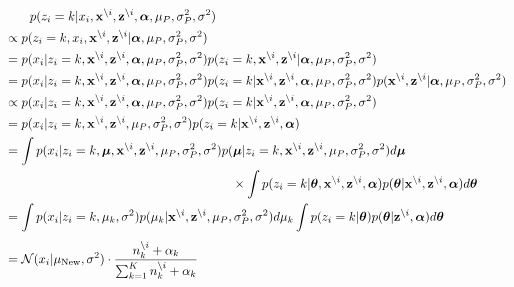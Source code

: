 \documentclass[a4paper,10.5pt,uplatex]{jsarticle}  %
\newcommand{\E}{\mathbb{E}}
\newcommand{\cN}{\mathcal{N}}
\newcommand{\btheta}{\boldsymbol{\theta}}
\newcommand{\balpha}{\boldsymbol{\alpha}}
\newcommand{\bmu}{\boldsymbol{\mu}}
\newcommand{\bz}{\mathbf{z}}
\newcommand{\bx}{\mathbf{x}}
\newcommand{\deli}{{\backslash i}}
\begin{document}
\begin{align}
  &\qquad p(z_i = k| x_i, \bx^\deli, \bz^\deli, \balpha, \mu_P, \sigma^2_P, \sigma^2)\\
  &\propto p(z_i=k, x_i, \bx^\deli, \bz^\deli | \balpha, \mu_P, \sigma^2_P, \sigma^2)\\
  &= p(x_i | z_i=k, \bx^\deli, \bz^\deli, \balpha, \mu_P, \sigma^2_P, \sigma^2) p(z_i=k, \bx^\deli, \bz^\deli | \balpha, \mu_P, \sigma^2_P, \sigma^2)\\
  &= p(x_i | z_i=k, \bx^\deli, \bz^\deli, \balpha, \mu_P, \sigma^2_P, \sigma^2) p(z_i=k | \bx^\deli, \bz^\deli, \balpha, \mu_P, \sigma^2_P, \sigma^2) p(\bx^\deli, \bz^\deli | \balpha, \mu_P, \sigma^2_P, \sigma^2)\\
  &\propto p(x_i | z_i=k, \bx^\deli, \bz^\deli, \balpha, \mu_P, \sigma^2_P, \sigma^2) p(z_i=k| \bx^\deli, \bz^\deli, \balpha, \mu_P, \sigma^2_P, \sigma^2)\\
  &= p(x_i | z_i=k, \bx^\deli, \bz^\deli,  \mu_P, \sigma^2_P, \sigma^2) p(z_i=k| \bx^\deli, \bz^\deli, \balpha)\\
  &= \int p(x_i| z_i=k, \bmu, \bx^\deli, \bz^\deli,  \mu_P, \sigma_P^2, \sigma^2) p(\bmu |z_i=k, \bx^\deli, \bz^\deli,  \mu_P, \sigma^2_P, \sigma^2) d\bmu \\
  &\qquad \qquad \qquad \qquad \qquad \qquad \qquad \qquad \qquad \times \int p(z_i=k| \btheta, \bx^\deli, \bz^\deli, \balpha) p(\btheta | \bx^\deli, \bz^\deli, \balpha) d\btheta\\
  &= \int p(x_i | z_i=k, \mu_k, \sigma^2) p(\mu_k | \bx^\deli, \bz^\deli, \mu_P, \sigma^2_P, \sigma^2) d\mu_k \int p(z_i =k|\btheta) p(\btheta | \bz^\deli,\balpha) d\btheta \label{pred1}\\[3.5pt]
  &= \cN(x_i | \mu_{\rm New}, \sigma^2) \cdot \frac{n_k^{\backslash i} + \alpha_k}{\sum_{k=1}^{K} n_k^{\backslash i} + \alpha_k} \label{eq:final}
\end{align}
\end{document}
